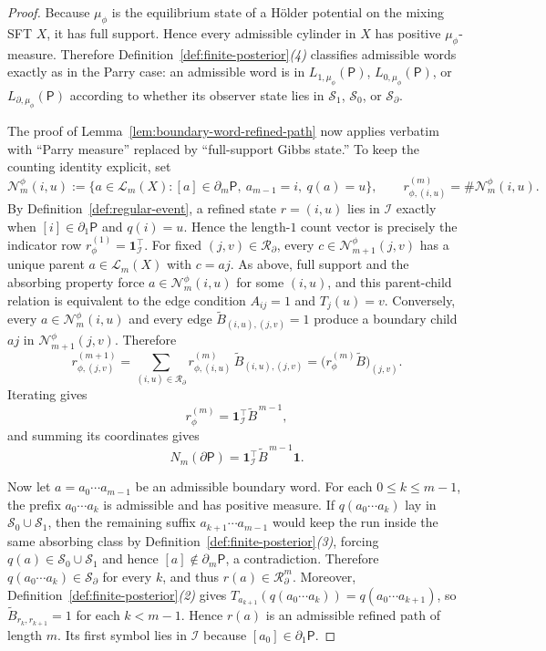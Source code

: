 \documentclass{etds}%
\numberwithin{equation}{section}
\theoremstyle{plain}
\theoremstyle{definition}
\theoremstyle{remark}
\begin{document}
\begin{proof}
Because $\mu_\phi$ is the equilibrium state of a H\"older potential on the
mixing SFT $X$, it has full support.  Hence every admissible cylinder in $X$
has positive $\mu_\phi$-measure.  Therefore Definition~\ref{def:finite-posterior}\emph{(4)}
classifies admissible words exactly as in the Parry case: an admissible word is
in $L_{1,\mu_\phi}(\mathsf{P})$, $L_{0,\mu_\phi}(\mathsf{P})$, or $L_{\partial,\mu_\phi}(\mathsf{P})$
according to whether its observer state lies in $\mathcal{S}_1$,
$\mathcal{S}_0$, or $\mathcal{S}_\partial$.

The proof of Lemma~\ref{lem:boundary-word-refined-path} now applies
verbatim with ``Parry measure'' replaced by ``full-support Gibbs state.''  To
keep the counting identity explicit, set
\[
\mathcal{N}_m^\phi(i,u)
:=\{a\in\mathcal{L}_m(X):[a]\in\partial_m\mathsf{P},\ a_{m-1}=i,\ q(a)=u\},
\qquad
r_{\phi,(i,u)}^{(m)}=\#\mathcal{N}_m^\phi(i,u).
\]
By Definition~\ref{def:regular-event}, a refined state $r=(i,u)$ lies in
$\mathcal{I}$ exactly when $[i]\in\partial_1\mathsf{P}$ and $q(i)=u$.  Hence
the length-$1$ count vector is precisely the indicator row
$r_\phi^{(1)}=\mathbf{1}_{\mathcal{I}}^{\!\top}$.  For fixed
$(j,v)\in\mathcal{R}_\partial$, every
$c\in\mathcal{N}_{m+1}^\phi(j,v)$ has a unique parent $a\in\mathcal{L}_m(X)$
with $c=aj$.  As above, full support and the absorbing property force
$a\in\mathcal{N}_m^\phi(i,u)$ for some $(i,u)$, and this parent-child relation
is equivalent to the edge condition $A_{ij}=1$ and $T_j(u)=v$.  Conversely,
every $a\in\mathcal{N}_m^\phi(i,u)$ and every edge
$\widetilde{B}_{(i,u),(j,v)}=1$ produce a boundary child $aj$ in
$\mathcal{N}_{m+1}^\phi(j,v)$.  Therefore
\[
r_{\phi,(j,v)}^{(m+1)}
=\sum_{(i,u)\in\mathcal{R}_\partial}
r_{\phi,(i,u)}^{(m)}\,\widetilde{B}_{(i,u),(j,v)}
=\bigl(r_\phi^{(m)}\widetilde{B}\bigr)_{(j,v)}.
\]
Iterating gives
\[
r_\phi^{(m)}=\mathbf{1}_{\mathcal{I}}^{\!\top}\widetilde{B}^{\,m-1},
\]
and summing its coordinates gives
\[
N_m(\partial\mathsf{P})
=\mathbf{1}_{\mathcal{I}}^{\!\top}\widetilde{B}^{\,m-1}\mathbf{1}.
\]

Now let $a=a_0\cdots a_{m-1}$ be an admissible boundary word.  For each
$0\le k\le m-1$, the prefix $a_0\cdots a_k$ is admissible and has positive
measure.  If $q(a_0\cdots a_k)$ lay in $\mathcal{S}_0\cup\mathcal{S}_1$, then
the remaining suffix $a_{k+1}\cdots a_{m-1}$ would keep the run inside the same
absorbing class by Definition~\ref{def:finite-posterior}\emph{(3)}, forcing
$q(a)\in\mathcal{S}_0\cup\mathcal{S}_1$ and hence $[a]\notin\partial_m\mathsf{P}$,
a contradiction.  Therefore $q(a_0\cdots a_k)\in\mathcal{S}_\partial$ for every
$k$, and thus
$r(a)\in\mathcal{R}_\partial^m$.  Moreover,
Definition~\ref{def:finite-posterior}\emph{(2)} gives
$T_{a_{k+1}}(q(a_0\cdots a_k))=q(a_0\cdots a_{k+1})$, so
$\widetilde{B}_{r_k,r_{k+1}}=1$ for each $k<m-1$.  Hence
$r(a)$ is an admissible refined path of length $m$.  Its first symbol lies in
$\mathcal{I}$ because $[a_0]\in\partial_1\mathsf{P}$.


\end{proof}
\end{document}
